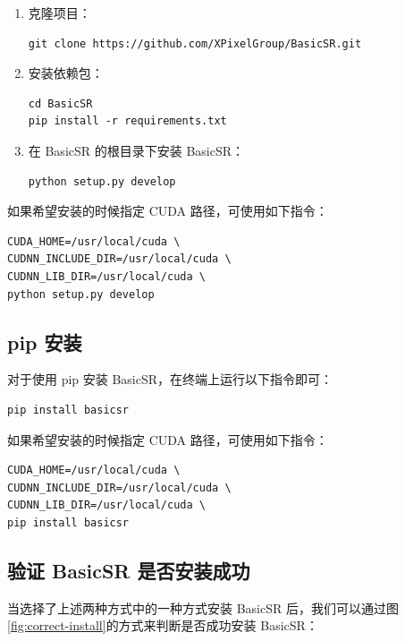 \documentclass[../main.tex]{subfiles}
\begin{document}
\begin{enumerate}
    \item 克隆项目：
          \begin{verbatim}
git clone https://github.com/XPixelGroup/BasicSR.git
    \end{verbatim}

    \item 安装依赖包：
          \begin{verbatim}
cd BasicSR
pip install -r requirements.txt
    \end{verbatim}

    \item 在 BasicSR 的根目录下安装 BasicSR：
          \begin{verbatim}
python setup.py develop
    \end{verbatim}
\end{enumerate}

如果希望安装的时候指定 CUDA 路径，可使用如下指令：

\begin{verbatim}
CUDA_HOME=/usr/local/cuda \
CUDNN_INCLUDE_DIR=/usr/local/cuda \
CUDNN_LIB_DIR=/usr/local/cuda \
python setup.py develop

\end{verbatim}

\subsection{pip 安装}
\label{installation:pip-install}
对于使用 pip 安装 BasicSR，在终端上运行以下指令即可：
\begin{verbatim}
pip install basicsr
    \end{verbatim}

如果希望安装的时候指定 CUDA 路径，可使用如下指令：

\begin{verbatim}
CUDA_HOME=/usr/local/cuda \
CUDNN_INCLUDE_DIR=/usr/local/cuda \
CUDNN_LIB_DIR=/usr/local/cuda \
pip install basicsr
\end{verbatim}

\subsection{验证 BasicSR 是否安装成功}

当选择了上述两种方式中的一种方式安装 BasicSR 后，我们可以通过图\ref{fig:correct-install}的方式来判断是否成功安装 BasicSR：
\end{document}
